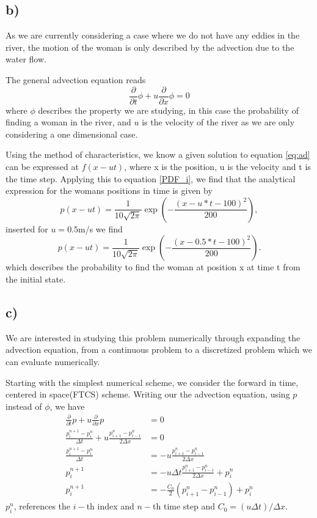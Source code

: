 \documentclass[10pt, a4paper]{amsart}
\begin{document}
\subsection{b)}
As we are currently considering a case where we do not have any eddies in the river, the motion of the woman is only described by the advection due to the water flow. 

The general advection equation reads 
\begin{equation}\label{eq:ad}
	\frac{\partial}{\partial t}\phi + u\frac{\partial}{\partial x}\phi = 0
\end{equation}
where $\phi$ describes the property we are studying, in this case the probability of finding a woman in the river, and $u$ is the velocity of the river as we are only considering a one dimensional case. 

Using the method of characteristics, we know a given solution to equation \ref{eq:ad} can be expressed at $f(x-ut)$, where x is the position, u is the velocity and t is the time step. Applying this to equation \ref*{PDF_i}, we find that the analytical expression for the womans positions in time is given by 
\begin{equation}
	p(x-ut) = \frac{1}{10\sqrt{2\pi}}\exp\left(-\frac{(x-u*t - 100)^2}{200}\right),
\end{equation}
inserted for $u = 0.5$m/s we find 
\begin{equation}\label{eq:P}
	p(x-ut) = \frac{1}{10\sqrt{2\pi}}\exp\left(-\frac{(x-0.5*t - 100)^2}{200}\right). 
\end{equation}
which describes the probability to find the woman at position x at time t from the initial state.  

\subsection{c)}
We are interested in studying this problem numerically through expanding the advection equation, from a continuous problem to a discretized problem which we can evaluate numerically. 

Starting with the simplest numerical scheme, we consider the forward in time, centered in space(FTCS) scheme. Writing our the advection equation, using $p$ instead of $\phi$, we have 
\begin{align}
	\frac{\partial }{\partial t}p + u\frac{\partial}{\partial x}p &= 0\\
	\frac{p_i^{n+1}-p_i^n}{\Delta t} + u\frac{p_{i+1}^n - p_{i-1}^n}{2\Delta x} &= 0\\
	\frac{p_i^{n+1}-p_i^n}{\Delta t} &= -u\frac{p_{i+1}^n - p_{i-1}^n}{2\Delta x}\\
	p_i^{n+1} &= -u\Delta t\frac{p_{i+1}^n - p_{i-1}^n}{2\Delta x} +p_i^n\\	
	p_i^{n+1} &= -\frac{C_0}{2}\left(p_{i+1}^n - p_{i-1}^n\right) + p_i^n\label{eq:disc}
\end{align}
$p_i^n$, references the $i-$th index and $n-$th time step and $C_0 = (u\Delta t) / \Delta x$.
\end{document}
